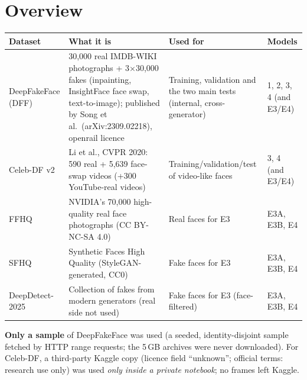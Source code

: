 \documentclass[11pt,a4paper]{report}
\begin{document}
\section{Overview}
\begin{center}
\small
\begin{tabular}{|L{2.3cm}|L{4.6cm}|L{3.9cm}|L{3.0cm}|}
\hline
\textbf{Dataset} & \textbf{What it is} & \textbf{Used for} & \textbf{Models}\\\hline
DeepFakeFace (DFF) & 30,000 real IMDB-WIKI photographs + 3$\times$30,000 fakes (inpainting, InsightFace face swap, text-to-image); published by Song et al.\ (arXiv:2309.02218), openrail licence & Training, validation and the two main tests (internal, cross-generator) & 1, 2, 3, 4 (and E3/E4)\\\hline
Celeb-DF v2 & Li et al., CVPR 2020: 590 real + 5,639 face-swap videos (+300 YouTube-real videos) & Training/validation/test of video-like faces & 3, 4 (and E3/E4)\\\hline
FFHQ & NVIDIA's 70,000 high-quality real face photographs (CC BY-NC-SA 4.0) & Real faces for E3 & E3A, E3B, E4\\\hline
SFHQ & Synthetic Faces High Quality (StyleGAN-generated, CC0) & Fake faces for E3 & E3A, E3B, E4\\\hline
DeepDetect-2025 & Collection of fakes from modern generators (real side not used) & Fake faces for E3 (face-filtered) & E3A, E3B, E4\\\hline
\end{tabular}
\end{center}
\textbf{Only a sample} of DeepFakeFace was used (a seeded, identity-disjoint sample fetched by HTTP range requests; the 5\,GB archives were never downloaded). For Celeb-DF, a third-party Kaggle copy (licence field ``unknown''; official terms: research use only) was used \emph{only inside a private notebook}; no frames left Kaggle.
\end{document}
